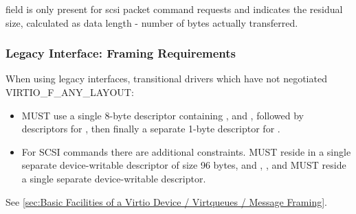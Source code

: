  field is only present for scsi packet command
requests and indicates the residual size, calculated as data
length - number of bytes actually transferred.

\subsubsection{Legacy Interface: Framing Requirements}\label{sec:Device Types / Block Device / Legacy Interface: Framing Requirements}

When using legacy interfaces, transitional drivers which have not
negotiated VIRTIO_F_ANY_LAYOUT:

\begin{itemize}
\item MUST use a single 8-byte descriptor containing ,
   and , followed by descriptors
  for , then finally a separate 1-byte descriptor
  for .

\item For SCSI commands there are additional constraints.
   MUST reside in a
  single separate device-writable descriptor of size 96 bytes,
  and , ,  and
   MUST reside a single separate
  device-writable descriptor.
\end{itemize}

See \ref{sec:Basic Facilities of a Virtio Device / Virtqueues / Message Framing}.
